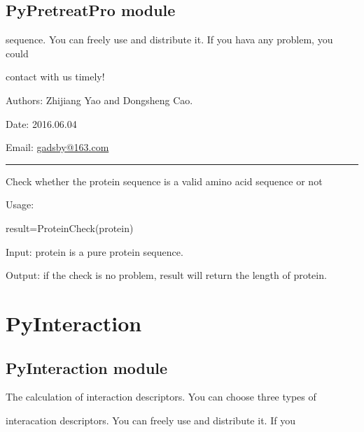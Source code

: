 \documentclass[letterpaper,10pt,english]{sphinxmanual}
\begin{document}
\subsection{PyPretreatPro module}
\label{reference/PyPretreatPro:pypretreatpro-module}\label{reference/PyPretreatPro::doc}\label{reference/PyPretreatPro:module-PyPretreatPro}
sequence. You can freely use and distribute it. If you hava any problem, you could

contact with us timely!

Authors: Zhijiang Yao and Dongsheng Cao.

Date: 2016.06.04

Email: \href{mailto:gadsby@163.com}{gadsby@163.com}


\bigskip\hrule{}\bigskip


\begin{fulllineitems}
\label{reference/PyPretreatPro:PyPretreatPro.ProteinCheck}
Check whether the protein sequence is a valid amino acid sequence or not

Usage:

result=ProteinCheck(protein)

Input: protein is a pure protein sequence.

Output: if the check is no problem, result will return the length of protein.

\end{fulllineitems}



\section{PyInteraction}
\label{reference/PyInteraction::doc}\label{reference/PyInteraction:pyinteraction}

\subsection{PyInteraction module}
\label{reference/PyInteraction_module:module-PyInteraction}\label{reference/PyInteraction_module:pyinteraction-module}\label{reference/PyInteraction_module::doc}
The calculation of interaction descriptors. You can choose three types of

interacation descriptors. You can freely use and distribute it. If you
\end{document}
